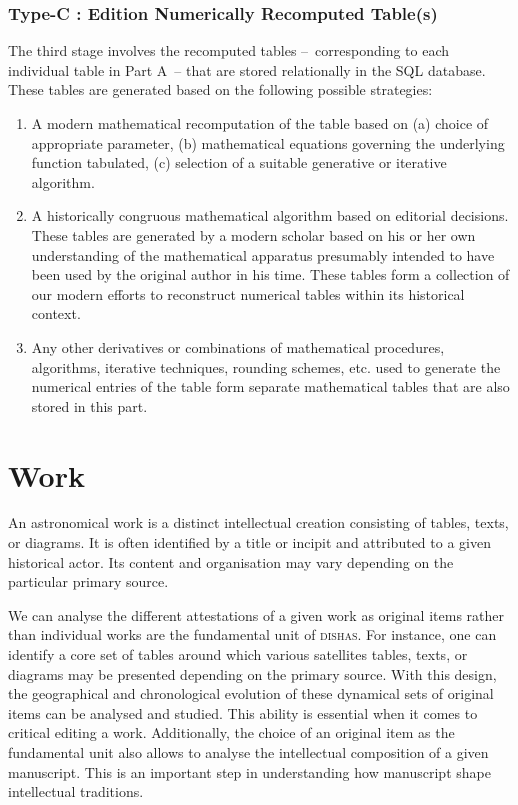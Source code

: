 \documentclass[a4paper,12pt,twoside]{book}
\begin{document}
				\subsubsection{Type-C : Edition Numerically Recomputed Table(s)}
	The third stage involves the recomputed tables –~corresponding to each individual table in Part A~– that are stored relationally in the SQL database. These tables are generated based on the following possible strategies:
	\begin{enumerate}
		\item A modern mathematical recomputation of the table based on (a) choice of appropriate parameter, (b) mathematical equations governing the underlying function tabulated, (c) selection of a suitable generative or iterative algorithm.
		\item A historically congruous mathematical algorithm based on editorial decisions. These tables are generated by a modern scholar based on his or her own understanding of the mathematical apparatus presumably intended to have been used by the original author in his time. These tables form a collection of our modern efforts to reconstruct numerical tables within its historical context.
		\item Any other derivatives or combinations of mathematical procedures, algorithms, iterative techniques, rounding schemes, etc. used to generate the numerical entries of the table form separate mathematical tables that are also stored in this part.
	\end{enumerate}
	
		\section{Work}
	An astronomical work is a distinct intellectual creation consisting of tables, texts, or diagrams. It is often identified by a title or incipit and attributed to a given historical actor. Its content and organisation may vary depending on the particular primary source.
	
	We can analyse the different attestations of a given work as original items rather than individual works are the fundamental unit of \textsc{dishas}. For instance, one can identify a core set of tables around which various satellites tables, texts, or diagrams may be presented depending on the primary source. With this design, the geographical and chronological evolution of these dynamical sets of original items can be analysed and studied. This ability is essential when it comes to critical editing a work. Additionally, the choice of an original item as the fundamental unit also allows to analyse the intellectual composition of a given manuscript. This is an important step in understanding how manuscript shape intellectual traditions.
	
\end{document}
